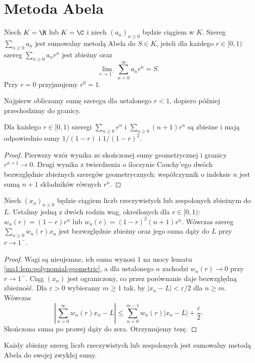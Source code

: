 \section{Metoda Abela}
\begin{definicja}
\label{ma1:def:abel-summation}
Niech $K=\R$ lub $K=\C$ i niech $(a_n)_{n\ge0}$ będzie ciągiem w $K$. Szereg $\sum_{n\ge0}a_n$ jest sumowalny metodą Abela do $S\in K$, jeżeli dla każdego $r\in[0,1)$ szereg $\sum_{n\ge0}a_nr^n$ jest zbieżny oraz
\[
 \lim_{r\to1^-}\sum_{n=0}^\infty a_nr^n=S.
\]
Przy $r=0$ przyjmujemy $r^0=1$.
\end{definicja}
Najpierw obliczamy sumę szeregu dla ustalonego $r<1$, dopiero później przechodzimy do granicy.
\begin{lemat}
\label{ma1:lem:polynomial-geometric}
Dla każdego $r\in[0,1)$ szeregi $\sum_{n\ge0}r^n$ i $\sum_{n\ge0}(n+1)r^n$ są zbieżne i mają odpowiednio sumy $1/(1-r)$ i $1/(1-r)^2$.
\end{lemat}
\begin{proof}
Pierwszy wzór wynika ze skończonej sumy geometrycznej i granicy $r^{n+1}\to0$. Drugi wynika z twierdzenia o iloczynie Cauchy'ego dwóch bezwzględnie zbieżnych szeregów geometrycznych: współczynnik o indeksie $n$ jest sumą $n+1$ składników równych $r^n$.
\end{proof}
\begin{lemat}
\label{ma1:lem:abel-weights}
Niech $(x_n)_{n\ge0}$ będzie ciągiem liczb rzeczywistych lub zespolonych zbieżnym do $L$. Ustalmy jedną z dwóch rodzin wag, określonych dla $r\in[0,1)$:
$w_n(r)=(1-r)r^n$ lub $w_n(r)=(1-r)^2(n+1)r^n$.
Wówczas szereg $\sum_{n\ge0}w_n(r)x_n$ jest bezwzględnie zbieżny oraz jego suma dąży do $L$ przy $r\to1^-$.
\end{lemat}
\begin{proof}
Wagi są nieujemne, ich suma wynosi $1$ na mocy lematu \ref{ma1:lem:polynomial-geometric}, a dla ustalonego $n$ zachodzi $w_n(r)\to0$ przy $r\to1^-$. Ciąg $(x_n)$ jest ograniczony, co przez porównanie daje bezwzględną zbieżność. Dla $\varepsilon>0$ wybieramy $m\ge1$ tak, by $|x_n-L|<\varepsilon/2$ dla $n\ge m$. Wówczas
\[
 \left|\sum_{n=0}^\infty w_n(r)x_n-L\right|
 \le\sum_{n=0}^{m-1}w_n(r)|x_n-L|+\frac{\varepsilon}{2}.
\]
Skończona suma po prawej dąży do zera. Otrzymujemy tezę.
\end{proof}
\begin{twierdzenie}
\label{ma1:thm:abel-regular}
Każdy zbieżny szereg liczb rzeczywistych lub zespolonych jest sumowalny metodą Abela do swojej zwykłej sumy.
\end{twierdzenie}
